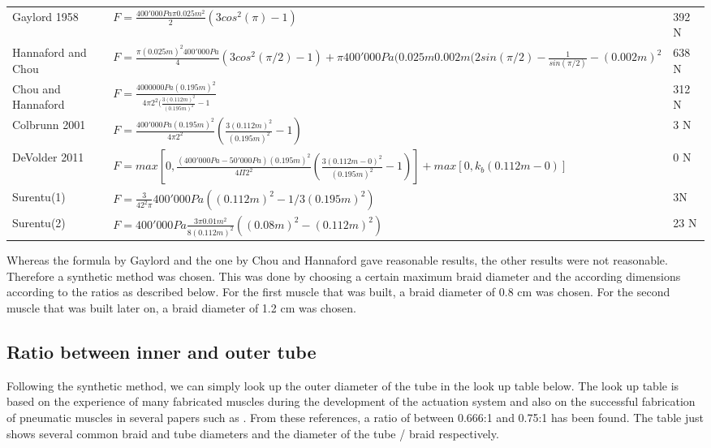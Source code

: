 \documentclass[main]{subfiles}
\begin{document}
\begin{table}[H]
\scriptsize
\begin{tabular}{p{2.5cm}p{10cm}|l}
\toprule
	Gaylord 1958 \cite{Gaylord1958}& $F = \frac{400'000 Pa \pi 0.025m^2}{2}(3 cos^2(\pi)-1)$ & 392 N\\

	Hannaford \newline and Chou \cite{Hannaford1995}& $ F = \frac{\pi (0.025m)^2 400'000 Pa}{4}(3cos^2(\pi/2)-1) + \pi 400'000 Pa (0.025m 0.002m(2sin(\pi/2)-\frac{1}{sin(\pi/2)} - (0.002m)^2$ & 638 N\\
	Chou and \newline Hannaford \cite{Hannaford1995} & $F= \frac{4000000 Pa (0.195m)^2}{4\pi 2^2(\frac{3(0.112m)^2}{(0.195m)^2}-1}$ & 312 N\\
	Colbrunn 2001& $F = \frac{400'000 Pa (0.195m)^2}{4\pi 2^2}(\frac{3(0.112m)^2}{(0.195m)^2}-1)$ & 3 N\\
	DeVolder 2011 &
	$F = max[0, \frac{(400'000 Pa-50'000 Pa) (0.195m)^2}{4\Pi 2^2}(\frac{3(0.112m-0)^2}{(0.195m)^2}-1)] + max[0,k_b (0.112m- 0)]$ & 0 N\\
	Surentu(1) & $ F =  \frac{3}{4 2^2\pi}400'000 Pa ((0.112m)^2 - 1/3(0.195m)^2)$ & 3N \\
	Surentu(2) & $ F = 400'000 Pa \frac{3\pi 0.01m^2}{8 (0.112m)^2}((0.08m)^2-(0.112m)^2)$ & 23 N\\
	\bottomrule
\end{tabular}
\normalsize
\end{table}

Whereas the formula by Gaylord and the one by Chou and Hannaford gave reasonable results, the other results were not reasonable. Therefore a synthetic method was chosen. This was done by choosing a certain maximum braid diameter and the according dimensions according to the ratios as described below. For the first muscle that was built, a braid diameter of 0.8 cm was chosen. For the second muscle that was built later on, a braid diameter of 1.2 cm was chosen. 


\subsection{Ratio between inner and outer tube}

Following the synthetic method, we can simply look up the outer diameter of the tube in the look up table below. The look up table is based on the experience of many fabricated muscles during the development of the actuation system and also on the successful fabrication of pneumatic muscles in several papers such as \cite{Klute1999}. From these references, a ratio of between 0.666:1 and 0.75:1 has been found. The table just shows several common braid and tube diameters and the diameter of the tube / braid respectively.
\end{document}
